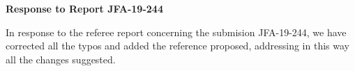 \documentclass[]{report}
\title{}
\author{}
\begin{document}
	
	\begin{center}
		\textbf{	Response to Report JFA-19-244}
	\end{center}
In response to the referee report concerning the submision JFA-19-244, we have corrected all the typos and added the reference proposed, addressing in this way all the changes suggested.
\end{document}
